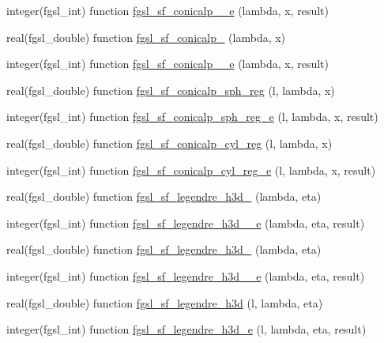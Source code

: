 \begin{DoxyCompactItemize}
\item 
integer(fgsl\-\_\-int) function \hyperlink{specfunc_8finc_a97d7773d6e9d7a5a20b85623107240fe}{fgsl\-\_\-sf\-\_\-conicalp\-\_\-\_\-e} (lambda, x, result)
\item 
real(fgsl\-\_\-double) function \hyperlink{specfunc_8finc_a3bb680614906528c022e197c2b0b7318}{fgsl\-\_\-sf\-\_\-conicalp\-\_} (lambda, x)
\item 
integer(fgsl\-\_\-int) function \hyperlink{specfunc_8finc_ab62ce997d158de5d7a9d518483208556}{fgsl\-\_\-sf\-\_\-conicalp\-\_\-\_\-e} (lambda, x, result)
\item 
real(fgsl\-\_\-double) function \hyperlink{specfunc_8finc_a11c52aac96d22334585ea7b6fd29fcd9}{fgsl\-\_\-sf\-\_\-conicalp\-\_\-sph\-\_\-reg} (l, lambda, x)
\item 
integer(fgsl\-\_\-int) function \hyperlink{specfunc_8finc_a903c76a10015fa1a0abf142afc033ac3}{fgsl\-\_\-sf\-\_\-conicalp\-\_\-sph\-\_\-reg\-\_\-e} (l, lambda, x, result)
\item 
real(fgsl\-\_\-double) function \hyperlink{specfunc_8finc_ac8ee55b9021c5e2c23b744765bddb373}{fgsl\-\_\-sf\-\_\-conicalp\-\_\-cyl\-\_\-reg} (l, lambda, x)
\item 
integer(fgsl\-\_\-int) function \hyperlink{specfunc_8finc_a0a2e0199a0c50c50090791c959dbf7c5}{fgsl\-\_\-sf\-\_\-conicalp\-\_\-cyl\-\_\-reg\-\_\-e} (l, lambda, x, result)
\item 
real(fgsl\-\_\-double) function \hyperlink{specfunc_8finc_ab5903aacdd1a2d46b70c67ab2ad7816a}{fgsl\-\_\-sf\-\_\-legendre\-\_\-h3d\-\_} (lambda, eta)
\item 
integer(fgsl\-\_\-int) function \hyperlink{specfunc_8finc_adffa978971a6881eb6f8cb7d7a718c58}{fgsl\-\_\-sf\-\_\-legendre\-\_\-h3d\-\_\-\_\-e} (lambda, eta, result)
\item 
real(fgsl\-\_\-double) function \hyperlink{specfunc_8finc_aeb960c0b1e2393677a18642e723de91e}{fgsl\-\_\-sf\-\_\-legendre\-\_\-h3d\-\_} (lambda, eta)
\item 
integer(fgsl\-\_\-int) function \hyperlink{specfunc_8finc_acd96c1b247f9feb26a6aba0f155fc826}{fgsl\-\_\-sf\-\_\-legendre\-\_\-h3d\-\_\-\_\-e} (lambda, eta, result)
\item 
real(fgsl\-\_\-double) function \hyperlink{specfunc_8finc_a49522d27cea17494b3b8037627f6590f}{fgsl\-\_\-sf\-\_\-legendre\-\_\-h3d} (l, lambda, eta)
\item 
integer(fgsl\-\_\-int) function \hyperlink{specfunc_8finc_aee989feed5b2b9559c15fda0f82a6ce0}{fgsl\-\_\-sf\-\_\-legendre\-\_\-h3d\-\_\-e} (l, lambda, eta, result)

\end{DoxyCompactItemize}
